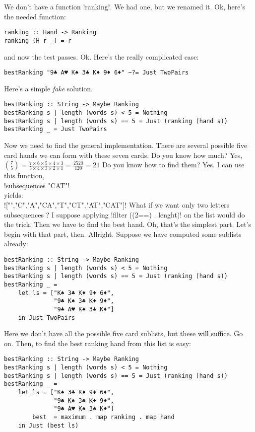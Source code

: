 We don't have a function \il!ranking!. We had one, but we renamed it.
\lhA Ok, here's the needed function:
\begin{lstlisting}[frame=single]
ranking :: Hand -> Ranking
ranking (H r _) = r
\end{lstlisting}
\success and now the test passes.
\lhN Ok. Here's the really complicated case:
\begin{lstlisting}[frame=single]
bestRanking "9♣ A♥ K♠ 3♣ K♦ 9♦ 6♦" ~?= Just TwoPairs
\end{lstlisting}
\lhA Here's a simple \emph{fake} solution.
\begin{lstlisting}[frame=single]
bestRanking :: String -> Maybe Ranking
bestRanking s | length (words s) < 5 = Nothing
bestRanking s | length (words s) == 5 = Just (ranking (hand s))
bestRanking _ = Just TwoPairs
\end{lstlisting}
\success Now we need to find the general implementation.
\lhN
There are several possible five card hands we can form with these seven cards. Do you know how much?
\lhA Yes, ${{7}\choose{5}} = \frac{7\times6 \times 5 \times 4 \times 3}{5 \times 4 \times 3 \times 2 \times 1} = \frac{2520}{120} = 21$
\lhN Do you know how to find them?
\lhA Yes. I can use this function, \\ 
\il!subsequences "CAT"! \\
yields: \\
\il!["","C","A","CA","T","CT","AT","CAT"]!
\lhN What if we want only two letters subsequences ?
\lhA I suppose applying \il!filter ((2==) . lenght)! on the list would do the trick.
\lhN Then we have to find the best hand.
\lhA Oh, that's the simplest part.
\lhN Let's begin with that part, then.
\lhA Allright. Suppose we have computed some sublists already:
\begin{lstlisting}[frame=single]
bestRanking :: String -> Maybe Ranking
bestRanking s | length (words s) < 5 = Nothing
bestRanking s | length (words s) == 5 = Just (ranking (hand s))
bestRanking _ = 
    let ls = ["K♠ 3♣ K♦ 9♦ 6♦", 
              "9♣ K♠ 3♣ K♦ 9♦", 
              "9♣ A♥ K♠ 3♣ K♦"]
    in Just TwoPairs
\end{lstlisting}
\success Here we don't have all the possible five card sublists, but these will suffice.
\lhN Go on.
\lhA Then, to find the best ranking hand from this list is easy:
\begin{lstlisting}[frame=single]
bestRanking :: String -> Maybe Ranking
bestRanking s | length (words s) < 5 = Nothing
bestRanking s | length (words s) == 5 = Just (ranking (hand s))
bestRanking _ = 
    let ls = ["K♠ 3♣ K♦ 9♦ 6♦", 
              "9♣ K♠ 3♣ K♦ 9♦", 
              "9♣ A♥ K♠ 3♣ K♦"]
        best  = maximum . map ranking . map hand
    in Just (best ls)
\end{lstlisting}
